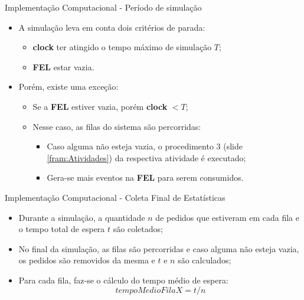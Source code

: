 \documentclass[xcolor=dvipsnames]{beamer}
\let\olditem=\item%
\renewcommand{\item}{\olditem \justifying}%
\begin{document}
\begin{frame}{Implementação Computacional - Período de simulação}
	\begin{itemize}
		\item A simulação leva em conta dois critérios de parada:
        \bigskip
		      \begin{itemize}
		      	\item \textbf{clock} ter atingido o tempo máximo de simulação $T$;
		      	      \bigskip
		      	\item \textbf{FEL} estar vazia.
		      	      \bigskip
		      \end{itemize}
		\item Porém, existe uma exceção:
		      \begin{itemize}
		      	\item Se a \textbf{FEL} estiver vazia, porém \textbf{clock} $< T$;
		      	      \bigskip
		      	\item Nesse caso, as filas do sistema são percorridas:
		      	      \bigskip
		      	      \begin{itemize}
		      	      	\item Caso alguma não esteja vazia, o procedimento 3 (slide \ref{fram:Atividades}) da respectiva atividade é executado;
		      	      	      \bigskip
		      	      	\item Gera-se mais eventos na \textbf{FEL} para serem consumidos.
		      	      \end{itemize}
		      \end{itemize}
	\end{itemize}
\end{frame}
		
\begin{frame}{Implementação Computacional - Coleta Final de Estatísticas}
	\begin{itemize}
		\item Durante a simulação, a quantidade $n$ de pedidos que estiveram em cada fila e o tempo total de espera $t$ são coletados;
		      \bigskip
		\item No final da simulação, as filas são percorridas e caso alguma não esteja vazia, os pedidos são removidos da mesma e $t$ e $n$ são calculados;
		      \bigskip
		\item Para cada fila, faz-se o cálculo do tempo médio de espera: $$ tempoMedioFilaX = t/n $$
	\end{itemize}
\end{frame}
		
\end{document}
